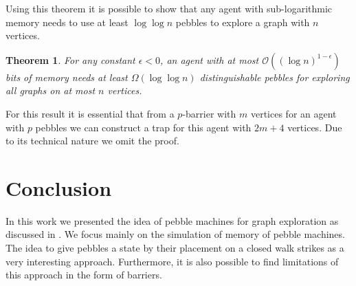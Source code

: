 \documentclass[oneside]{scrartcl}
\newtheorem{thm}{Theorem}
\begin{document}
Using this theorem it is possible to show that any agent with sub-logarithmic
memory needs to use at least $\log\log n$ pebbles to explore a graph with $n$
vertices.
\begin{thm}
  For any constant $\epsilon < 0$, an agent with at most
  $\mathcal{O}((\log n)^{1-\epsilon})$ bits of memory needs at least
  $\Omega(\log\log n)$ distinguishable pebbles for exploring all graphs on at
  most $n$ vertices.
\end{thm}

For this result it is essential that from a $p$-barrier with $m$
vertices for an agent with $p$ pebbles we can construct a trap for this agent
with $2m+4$ vertices. Due to its technical nature we omit the proof.

\section{Conclusion}
In this work we presented the idea of pebble machines for graph exploration
as discussed in \cite{pebbles}. We focus mainly on the simulation of
memory of pebble machines. The idea to give pebbles a state by their placement
on a closed walk strikes as a very interesting approach. Furthermore, it is
also possible to find limitations of this approach in the form of barriers.

\printbibliography
\end{document}
